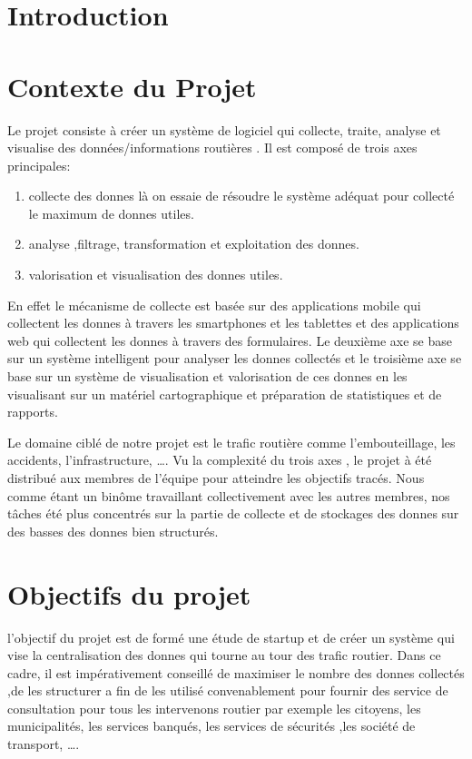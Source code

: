 \section*{Introduction}




\section{Contexte du Projet}

Le projet  consiste à créer un système de logiciel qui collecte,
traite,
analyse et visualise des données/informations routières . Il est composé de
trois axes principales:
\begin{enumerate}
 \item collecte des donnes là on essaie de résoudre le système adéquat pour collecté
 le maximum de donnes utiles.
 \item analyse ,filtrage, transformation et exploitation des donnes.
 \item valorisation et visualisation des donnes utiles.
\end{enumerate}

En effet le mécanisme de collecte est basée sur des applications mobile qui
collectent
les
donnes à travers les smartphones et les tablettes et des
applications web qui collectent les donnes à travers des formulaires.
Le deuxième  axe se base sur un système intelligent pour analyser les donnes
collectés et le troisième axe se base sur  un système de visualisation et
valorisation de ces donnes en les
visualisant sur un matériel cartographique et préparation de statistiques et
de rapports.

Le domaine ciblé de notre projet est le trafic routière comme l'embouteillage, les accidents,
l'infrastructure, \ldots.
Vu la complexité du trois axes , le projet à été distribué aux membres de
l'équipe 
pour atteindre
les objectifs tracés.
Nous comme étant un binôme travaillant collectivement avec les autres membres,
nos tâches été plus concentrés sur la partie de collecte et de stockages des donnes
sur des basses des donnes bien structurés.

\section{Objectifs du projet}
l'objectif du projet  est de formé une étude de startup et de
créer un système qui vise la centralisation des donnes qui tourne au tour des trafic
routier.
Dans ce cadre, il est impérativement conseillé de maximiser le nombre des
donnes collectés
,de les structurer a fin de les utilisé convenablement pour fournir des service de
consultation pour tous les intervenons routier par exemple les citoyens,
les municipalités,
les services banqués, les services de sécurités ,les société de transport, \ldots.

